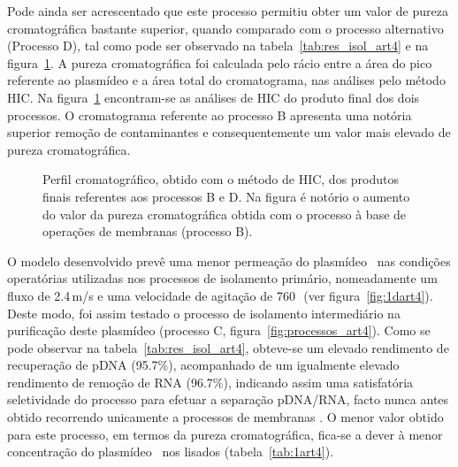 Pode ainda ser acrescentado que este processo permitiu obter um valor de pureza cromatográfica bastante superior, quando comparado com o processo alternativo (Processo D), tal como pode ser observado na tabela~\ref{tab:res_isol_art4} e na figura~\ref{fig:hic_comparacao_art4}.
%
A pureza cromatográfica foi calculada pelo rácio entre a área do pico referente ao plasmídeo e a área total do cromatograma, nas análises pelo método HIC. Na figura~\ref{fig:hic_comparacao_art4} encontram-se as análises de HIC do produto final dos dois processos. O cromatograma referente ao processo B apresenta uma notória superior remoção de contaminantes e consequentemente um valor mais elevado de pureza cromatográfica.
\begin{figure}[!t]
	\centering
	
	\caption[Cromatogramas HIC do produto final dos processos B e C.]{Perfil cromatográfico, obtido com o método de HIC, dos produtos finais referentes aos processos B e D. Na figura é notório o aumento do valor da pureza cromatográfica obtida com o processo à base de operações de membranas (processo B).}
	\label{fig:hic_comparacao_art4}
\end{figure}

O modelo desenvolvido prevê uma menor permeação do plasmídeo \pCAMBIA\ nas condições operatórias utilizadas nos processos de isolamento primário, nomeadamente um fluxo de 2.4\,\micro m/s e uma velocidade de agitação de 760\,\minmum\ (ver figura~\ref{fig:1dart4}). Deste modo, foi assim testado o processo de isolamento intermediário na purificação deste plasmídeo (processo C, figura~\ref{fig:processos_art4}). Como se pode observar na tabela~\ref{tab:res_isol_art4}, obteve-se um elevado rendimento de recuperação de pDNA (95.7\%), acompanhado de um igualmente elevado rendimento de remoção de RNA (96.7\%), indicando assim uma satisfatória seletividade do processo para efetuar a separação pDNA/RNA, facto nunca antes obtido recorrendo unicamente a processos de membranas \cite{kahn,duvaltff,freitas}. O menor valor obtido para este processo, em termos da pureza cromatográfica, fica-se a dever à menor concentração do plasmídeo \pCAMBIA\ nos lisados (tabela~\ref{tab:1art4}).
%

